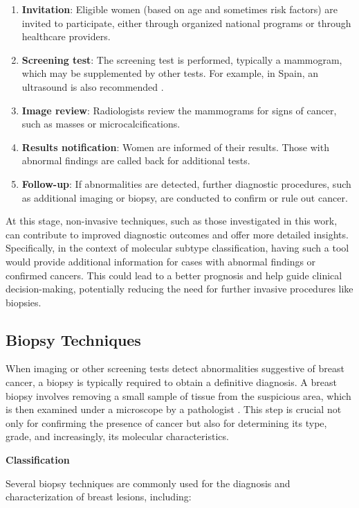 \documentclass[a4paper,10pt]{book}
\begin{document}
\begin{enumerate}
    \item \textbf{Invitation}: Eligible women (based on age and sometimes risk factors) are invited to participate, either through organized national programs or through healthcare providers.
    \item \textbf{Screening test}: The screening test is performed, typically a mammogram, which may be supplemented by other tests. For example, in Spain, an ultrasound is also recommended \cite{noauthor_map_nodate}.
    \item \textbf{Image review}: Radiologists review the mammograms for signs of cancer, such as masses or microcalcifications.
    \item \textbf{Results notification}: Women are informed of their results. Those with abnormal findings are called back for additional tests.
    \item \textbf{Follow-up}: If abnormalities are detected, further diagnostic procedures, such as additional imaging or biopsy, are conducted to confirm or rule out cancer.
\end{enumerate}


At this stage, non-invasive techniques, such as those investigated in this work, can contribute to improved diagnostic outcomes and offer more detailed insights. Specifically, in the context of molecular subtype classification, having such a tool would provide additional information for cases with abnormal findings or confirmed cancers. This could lead to a better prognosis and help guide clinical decision-making, potentially reducing the need for further invasive procedures like biopsies.

\subsection{Biopsy Techniques}

When imaging or other screening tests detect abnormalities suggestive of breast cancer, a biopsy is typically required to obtain a definitive diagnosis. A breast biopsy involves removing a small sample of tissue from the suspicious area, which is then examined under a microscope by a pathologist \cite{DefinitionBiopsyNCI2011}. This step is crucial not only for confirming the presence of cancer but also for determining its type, grade, and increasingly, its molecular characteristics.

\textbf{Classification}

Several biopsy techniques are commonly used for the diagnosis and characterization of breast lesions, including:
\end{document}
